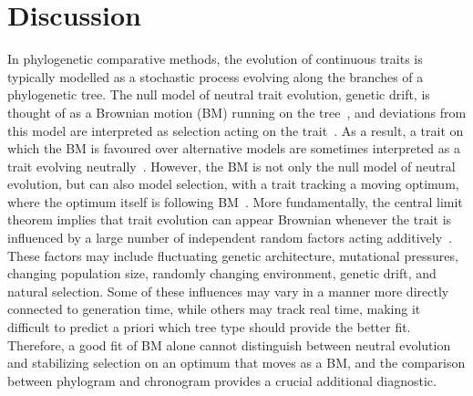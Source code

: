 \documentclass{article}
\begin{document}
\section*{Discussion}
In phylogenetic comparative methods, the evolution of continuous traits is typically modelled as a stochastic process evolving along the branches of a phylogenetic tree.
The null model of neutral trait evolution, genetic drift, is thought of as a Brownian motion (BM) running on the tree~\citep{lynch_phenotypic_1986, felsenstein_phylogenies_1988a}, and deviations from this model are interpreted as selection acting on the trait~\citep{butler_phylogenetic_2004}.
As a result, a trait on which the BM is favoured over alternative models are sometimes interpreted as a trait evolving neutrally~\citep{khaitovich_evolution_2006, catalan_drift_2019}.
However, the BM is not only the null model of neutral evolution, but can also model selection, with a trait tracking a moving optimum, where the optimum itself is following BM~\citep{hansen_translating_1996, latrille_detecting_2024}.
More fundamentally, the central limit theorem implies that trait evolution can appear Brownian whenever the trait is influenced by a large number of independent random factors acting additively~\citep{felsenstein_phylogenies_1985}.
These factors may include fluctuating genetic architecture, mutational pressures, changing population size, randomly changing environment, genetic drift, and natural selection.
Some of these influences may vary in a manner more directly connected to generation time, while others may track real time, making it difficult to predict a priori which tree type should provide the better fit.
Therefore, a good fit of BM alone cannot distinguish between neutral evolution and stabilizing selection on an optimum that moves as a BM, and the comparison between phylogram and chronogram provides a crucial additional diagnostic.
\end{document}
